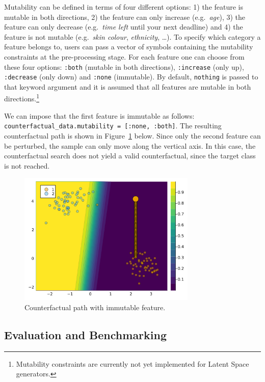 \documentclass[
  letterpaper,
  DIV=11,
  numbers=noendperiod]{scrartcl}
\begin{document}
Mutability can be defined in terms of four different options: 1) the
feature is mutable in both directions, 2) the feature can only increase
(e.g.~\emph{age}), 3) the feature can only decrease (e.g.~\emph{time
left} until your next deadline) and 4) the feature is not mutable
(e.g.~\emph{skin colour}, \emph{ethnicity}, \ldots). To specify which
category a feature belongs to, users can pass a vector of symbols
containing the mutability constraints at the pre-processing stage. For
each feature one can choose from these four options: \texttt{:both}
(mutable in both directions), \texttt{:increase} (only up),
\texttt{:decrease} (only down) and \texttt{:none} (immutable). By
default, \texttt{nothing} is passed to that keyword argument and it is
assumed that all features are mutable in both directions.\footnote{Mutability
  constraints are currently not yet implemented for Latent Space
  generators.}

We can impose that the first feature is immutable as follows:
\texttt{counterfactual\_data.mutability\ =\ {[}:none,\ :both{]}}. The
resulting counterfactual path is shown in Figure~\ref{fig-mutability}
below. Since only the second feature can be perturbed, the sample can
only move along the vertical axis. In this case, the counterfactual
search does not yield a valid counterfactual, since the target class is
not reached.

\begin{figure}

{\centering \includegraphics[width=3.33333in,height=2.5in]{www/constraint_mutability.png}

}

\caption{\label{fig-mutability}Counterfactual path with immutable
feature.}

\end{figure}

\hypertarget{sec-eval}{%
\subsection{Evaluation and Benchmarking}\label{sec-eval}}
\end{document}

